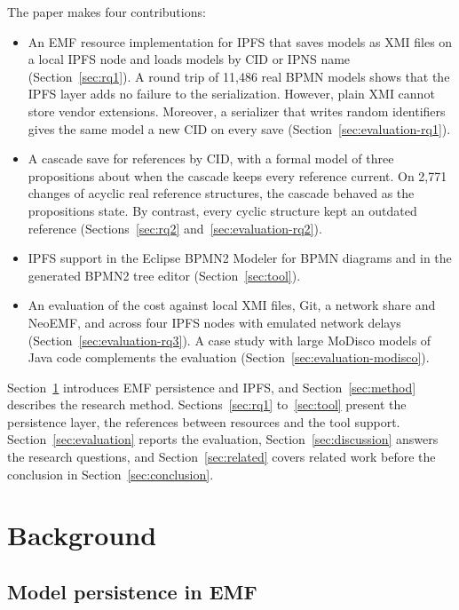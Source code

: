 \documentclass[5p,times,twocolumn]{elsarticle}
\theoremstyle{definition}
\theoremstyle{plain}
\begin{document}
The paper makes four contributions:
\begin{itemize}
\item An EMF resource implementation for IPFS that saves models as XMI files on a local IPFS node and loads models by CID or IPNS name (Section~\ref{sec:rq1}). A round trip of 11,486 real BPMN models shows that the IPFS layer adds no failure to the serialization. However, plain XMI cannot store vendor extensions. Moreover, a serializer that writes random identifiers gives the same model a new CID on every save (Section~\ref{sec:evaluation-rq1}).
\item A cascade save for references by CID, with a formal model of three propositions about when the cascade keeps every reference current. On 2,771 changes of acyclic real reference structures, the cascade behaved as the propositions state. By contrast, every cyclic structure kept an outdated reference (Sections~\ref{sec:rq2} and~\ref{sec:evaluation-rq2}).
\item IPFS support in the Eclipse BPMN2 Modeler for BPMN diagrams and in the generated BPMN2 tree editor (Section~\ref{sec:tool}).
\item An evaluation of the cost against local XMI files, Git, a network share and NeoEMF, and across four IPFS nodes with emulated network delays (Section~\ref{sec:evaluation-rq3}). A case study with large MoDisco models of Java code complements the evaluation (Section~\ref{sec:evaluation-modisco}).
\end{itemize}

Section~\ref{sec:background} introduces EMF persistence and IPFS, and Section~\ref{sec:method} describes the research method. Sections~\ref{sec:rq1} to~\ref{sec:tool} present the persistence layer, the references between resources and the tool support. Section~\ref{sec:evaluation} reports the evaluation, Section~\ref{sec:discussion} answers the research questions, and Section~\ref{sec:related} covers related work before the conclusion in Section~\ref{sec:conclusion}.

\section{Background}\label{sec:background}

\subsection{Model persistence in EMF}\label{sec:background-emf}
\end{document}
